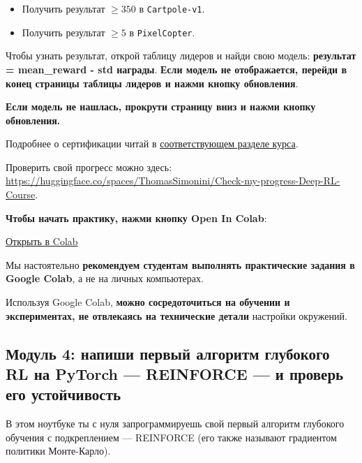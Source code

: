 \documentclass[11pt,a4paper]{article}
\begin{document}
\begin{itemize}
\tightlist
\item
  Получить результат \(\geq 350\) в \texttt{Cartpole-v1}.
\item
  Получить результат \(\geq 5\) в \texttt{PixelCopter}.
\end{itemize}

Чтобы узнать результат, открой таблицу лидеров и найди свою модель: \textbf{результат = mean\_reward - std награды}. \textbf{Если модель не отображается, перейди в конец страницы таблицы лидеров и нажми кнопку обновления}.

\textbf{Если модель не нашлась, прокрути страницу вниз и нажми кнопку обновления.}

Подробнее о сертификации читай в \href{https://huggingface.co/deep-rl-course/en/unit0/introduction#certification-process}{соответствующем разделе курса}.

Проверить свой прогресс можно здесь: \url{https://huggingface.co/spaces/ThomasSimonini/Check-my-progress-Deep-RL-Course}.

\textbf{Чтобы начать практику, нажми кнопку Open In Colab}:

\href{https://colab.research.google.com/github/huggingface/deep-rl-class/blob/master/notebooks/unit4/unit4.ipynb}{Открыть в Colab}

Мы настоятельно \textbf{рекомендуем студентам выполнять практические задания в Google Colab}, а не на личных компьютерах.

Используя Google Colab, \textbf{можно сосредоточиться на обучении и экспериментах, не отвлекаясь на технические детали} настройки окружений.

\subsection{Модуль 4: напиши первый алгоритм глубокого RL на PyTorch --- REINFORCE --- и проверь его устойчивость}\label{unit-4-code-your-first-deep-reinforcement-learning-algorithm-with-pytorch-reinforce.-and-test-its-robustness}


В этом ноутбуке ты с нуля запрограммируешь свой первый алгоритм глубокого обучения с подкреплением --- REINFORCE (его также называют градиентом политики Монте-Карло).
\end{document}
